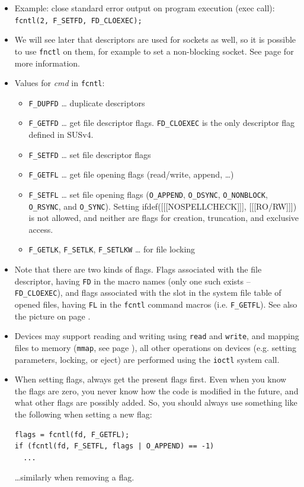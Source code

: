 \begin{itemize}
\item Example: close standard error output on program execution (exec call):\\
\texttt{fcntl(2, F\_SETFD, FD\_CLOEXEC);}
\item We will see later that descriptors are used for sockets as well, so it is
possible to use \texttt{fnctl} on them, for example to set a non-blocking
socket.  See page \pageref{CONNECT} for more information.
\item Values for \emph{cmd} in \texttt{fcntl}:
\begin{itemize}
\item \texttt{F\_DUPFD} \dots{} duplicate descriptors
\item \texttt{F\_GETFD} \dots{} get file descriptor flags.  \texttt{FD\_CLOEXEC}
is the only descriptor flag defined in SUSv4.
\item \texttt{F\_SETFD} \dots{} set file descriptor flags
\item \texttt{F\_GETFL} \dots{} get file opening flags (read/write, append,
\dots)
\item \texttt{F\_SETFL} \dots{} set file opening flags
(\texttt{O\_APPEND}, \texttt{O\_DSYNC}, \texttt{O\_NONBLOCK},
\texttt{O\_R\-SYNC}, and \texttt{O\_SYNC}).
Setting ifdef([[[NOSPELLCHECK]]], [[[RO/RW]]]) is not allowed, and neither are
flags for creation, truncation, and exclusive access.
\item \texttt{F\_GETLK}, \texttt{F\_SETLK}, \texttt{F\_SETLKW} \dots{}
for file locking
\end{itemize}
\item Note that there are two kinds of flags.  Flags associated with the file
descriptor, having \texttt{FD} in the macro names (only one such exists --
\texttt{FD\_CLOEXEC}), and flags associated with the slot in the system file
table of opened files, having \texttt{FL} in the \texttt{fcntl} command macros
(i.e. \texttt{F\_GETFL}).  See also the picture on page \pageref{OPENFILETABLES}.
\item Devices may support reading and writing using \texttt{read} and
\texttt{write}, and mapping files to memory (\texttt{mmap}, see page
\pageref{MMAP}), all other operations on devices (e.g. setting parameters,
locking, or eject) are performed using the \texttt{ioctl} system call.
\item When setting flags, always get the present flags first.  Even when you
know the flags are zero, you never know how the code is modified in the future,
and what other flags are possibly added.  So, you should always use something
like the following when setting a new flag:

\begin{verbatim}
flags = fcntl(fd, F_GETFL);
if (fcntl(fd, F_SETFL, flags | O_APPEND) == -1)
  ...
\end{verbatim}

\dots similarly when removing a flag.
\end{itemize}

